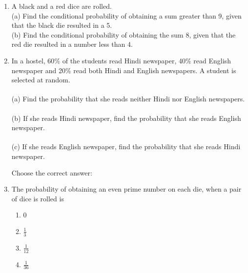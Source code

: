 \begin{enumerate}[label=\arabic*.,ref=\thesubsection.\theenumi]
\solution

\item A black and a red dice are rolled.\\
(a) Find the conditional probability of obtaining a sum greater than 9, given that the black die resulted in a 5.\\
(b) Find the conditional probability of obtaining the sum 8, given that the red die resulted in a number less than 4.\\
\solution

\item In a hostel, 60$\%$ of the students read Hindi newspaper, 40$\%$ read English newspaper and 20$\%$ read both Hindi and English newspapers. A student is selected at random.\\
\\(a) Find the probability that she reads neither Hindi nor English newspapers.\\
\\(b) If she reads Hindi newspaper, find the probability that she reads English newspaper.\\
\\(c) If she reads English newspaper, find the probability that she reads Hindi newspaper.\\
\solution


Choose the correct answer: 
\item The probability of obtaining an even prime number on each die, when a pair of dice is rolled is
\begin{enumerate}
\item 0
\item $\frac{1}{3}$
\item $\frac{1}{12}$
\item $\frac{1}{36}$
\end{enumerate}
\solution

\end{enumerate}

